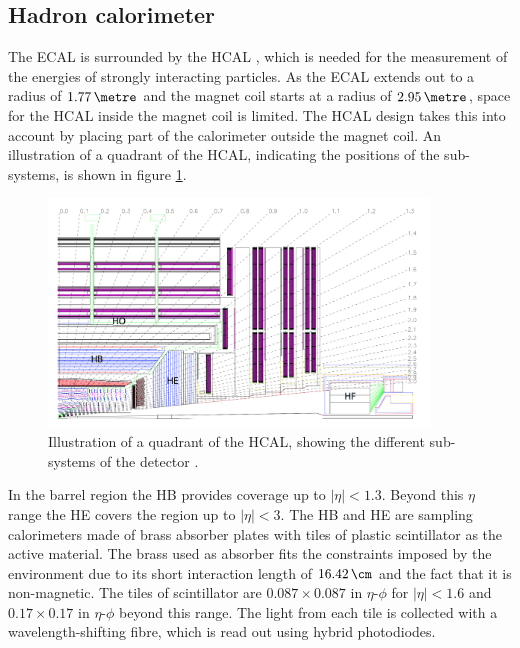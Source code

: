 \subsection{Hadron calorimeter}
\label{sec:CMSLHC_CMS_hcal}
The \ac{ECAL} is surrounded by the \ac{HCAL} \cite{cms-jinst}, which is needed for the
measurement of the energies of strongly interacting particles. As
the \ac{ECAL} extends out to a radius of $1.77\,\metre$ and the magnet coil
starts at a radius of $2.95\,\metre$, space for the \ac{HCAL} inside the magnet
coil is limited. The \ac{HCAL} design takes
this into account by placing part of the calorimeter outside the magnet coil. An
illustration of a quadrant of the
\ac{HCAL}, indicating the positions of the sub-systems, is shown
in figure \ref{fig:CMS_HCAL}.

\begin{figure}[h!]
\begin{center}
\includegraphics[width=0.9\textwidth]{./Detector/Plots/HCAL.png}
\caption[Illustration of a quadrant of the HCAL, showing the different
sub-systems of the detector.]{Illustration of a quadrant of the \ac{HCAL}, showing the different
sub-systems of the detector \cite{cms-jinst}.}
\label{fig:CMS_HCAL}
\end{center}
\end{figure}

In the barrel region the \ac{HB} provides
coverage up to $|\eta|<1.3$. Beyond this $\eta$ range the \ac{HE} covers
the region up to $|\eta|<3$. The \ac{HB} and \ac{HE} are sampling calorimeters made of brass absorber
plates with tiles of plastic scintillator as the active material. The brass used as 
absorber fits the constraints imposed by the environment due to its short interaction length
of $16.42\,\cm$ and the fact that it is non-magnetic. The tiles of scintillator 
are $0.087 \times 0.087$ in $\eta$-$\phi$ for $|\eta|<1.6$ and $0.17\times0.17$ in $\eta$-$\phi$
beyond this range. The light from each tile is collected with a wavelength-shifting fibre, 
which is read out using hybrid photodiodes. 

